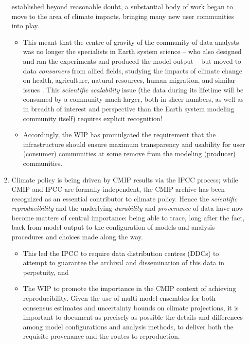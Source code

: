 \documentclass[gmd,manuscript]{copernicus}
\newcommand{\pipref}[1] {\citep{ref:#1}}
\begin{document}
\begin{enumerate}
  established beyond reasonable doubt, a substantial body of work
  began to move to the area of climate impacts, bringing many new
  user communities into play.
  \begin{itemize} \item This meant that the
  centre of gravity of the community of data analysts was no longer
  the specialists in Earth system science -- who also designed and ran
  the experiments and produced the model output -- but moved to data
  \emph{consumers} from allied fields, studying the impacts of climate
  change on health, agriculture, natural resources, human migration,
  and similar issues \pipref{mossetal2010}. This
  \emph{scientific scalability} issue (the data during its lifetime will be
  consumed by a community much larger, both in sheer numbers, as well
  as in breadth of interest and perspective than the Earth
  system modeling community itself) requires explicit recognition!
  \item Accordingly, the WIP has promulgated the requirement 
  that the infrastructure should ensure maximum transparency and
  usability for user (consumer) communities at some remove from the
  modeling (producer) communities.
\end{itemize}
\item\label{repro} Climate policy is being driven by CMIP results via
the IPCC process;  while CMIP and IPCC are formally independent, the
  CMIP archive has been recognized as an essential contributor to climate
  policy.  Hence the \emph{scientific reproducibility}  \pipref{collinstabak2014}
  and the underlying \emph{durability} and \emph{provenance} of data have now become matters of
  central importance: being able to trace, long after the fact, back
  from model output to the configuration of models and analysis
  procedures and choices made along the way. 
  \begin{itemize}
  \item This led the IPCC to require data distribution centres
  (DDCs) to attempt to guarantee the archival and dissemination of this
  data in perpetuity, and
  \item The WIP to promote the importance in the CMIP
  context of achieving  reproducibility.  Given the use of 
  multi-model ensembles for both consensus estimates
  and uncertainty bounds on climate projections, it is important to
  document as precisely as possible the details and differences among
  model configurations and analysis methods, to deliver both the requisite
  provenance and the routes to reproduction.

\end{itemize}
\end{enumerate}
\end{document}
